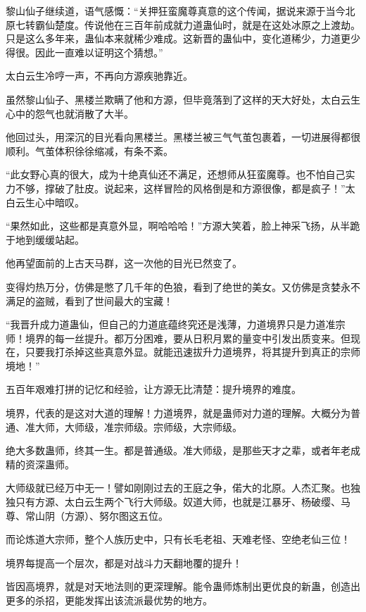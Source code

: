 
\begin{this_body}

黎山仙子继续道，语气感慨：“关押狂蛮魔尊真意的这个传闻，据说来源于当今北原七转霸仙楚度。传说他在三百年前成就力道蛊仙时，就是在这处冰原之上渡劫。只是这么多年来，蛊仙本来就稀少难成。这新晋的蛊仙中，变化道稀少，力道更少得很。因此一直难以证明这个猜想。”

太白云生冷哼一声，不再向方源疾驰靠近。

虽然黎山仙子、黑楼兰欺瞒了他和方源，但毕竟落到了这样的天大好处，太白云生心中的怨气也就消散了大半。

他回过头，用深沉的目光看向黑楼兰。黑楼兰被三气气茧包裹着，一切进展得都很顺利。气茧体积徐徐缩减，有条不紊。

“此女野心真的很大，成为十绝真仙还不满足，还想师从狂蛮魔尊。也不怕自己实力不够，撑破了肚皮。说起来，这样冒险的风格倒是和方源很像，都是疯子！”太白云生心中暗叹。

“果然如此，这些都是真意外显，啊哈哈哈！”方源大笑着，脸上神采飞扬，从半跪于地到缓缓站起。

他再望面前的上古天马群，这一次他的目光已然变了。

变得灼热万分，仿佛是憋了几千年的色狼，看到了绝世的美女。又仿佛是贪婪永不满足的盗贼，看到了世间最大的宝藏！

“我晋升成力道蛊仙，但自己的力道底蕴终究还是浅薄，力道境界只是力道准宗师！境界的每一丝提升。都万分困难，要从日积月累的量变中引发出质变来。但现在，只要我打杀掉这些真意外显。就能迅速拔升力道境界，将其提升到真正的宗师境地！”

五百年艰难打拼的记忆和经验，让方源无比清楚：提升境界的难度。

境界，代表的是这对大道的理解！力道境界，就是蛊师对力道的理解。大概分为普通、准大师，大师级，准宗师级。宗师级，大宗师级。

绝大多数蛊师，终其一生。都是普通级。准大师级，是那些天才之辈，或者年老成精的资深蛊师。

大师级就已经万中无一！譬如刚刚过去的王庭之争，偌大的北原。人杰汇聚。也独独只有方源、太白云生两个飞行大师级。奴道大师，也就是江暴牙、杨破缨、马尊、常山阴（方源）、努尔图这五位。

而论炼道大宗师，整个人族历史中，只有长毛老祖、天难老怪、空绝老仙三位！

境界每提高一个层次，都是对战斗力天翻地覆的提升！

皆因高境界，就是对天地法则的更深理解。能令蛊师炼制出更优良的新蛊，创造出更多的杀招，更能发挥出该流派最优势的地方。


\end{this_body}
